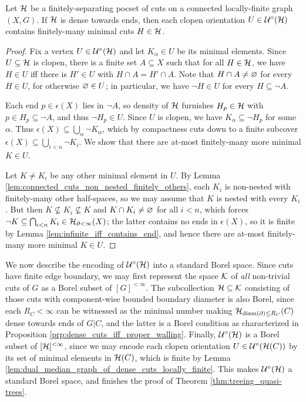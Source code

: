 \documentclass[reqno]{amsart}
\begin{document}
    \begin{lemma}\label{lem:dual_median_graph_of_dense_cuts_locally_finite}
        Let $\mc{H}$ be a finitely-separating pocset of cuts on a connected locally-finite graph $(X,G)$. If $\mc{H}$ is dense towards ends, then each clopen orientation $U\in\mc{U}^\circ(\mc{H})$ contains finitely-many minimal cuts $H\in\mc{H}$.
    \end{lemma}
    \begin{proof}
        Fix a vertex $U\in\mc{U}^\circ(\mc{H})$ and let $K_\alpha\in U$ be its minimal elements. Since $U\subseteq\mc{H}$ is clopen, there is a finite set $A\subseteq X$ such that for all $H\in\mc{H}$, we have $H\in U$ iff there is $H'\in U$ with $H\cap A=H'\cap A$. Note that $H\cap A\neq\em$ for every $H\in U$, for otherwise $\em\in U$; in particular, we have $\lnot H\in U$ for every $H\subseteq\lnot A$.

        Each end $p\in\epsilon(X)$ lies in $\lnot A$, so density of $\mc{H}$ furnishes $H_p\in\mc{H}$ with $p\in H_p\subseteq\lnot A$, and thus $\lnot H_p\in U$. Since $U$ is clopen, we have $K_\alpha\subseteq\lnot H_p$ for some $\alpha$. Thus $\epsilon(X)\subseteq\bigcup_\alpha\lnot K_\alpha$, which by compactness cuts down to a finite subcover $\epsilon(X)\subseteq\bigcup_{i<n}\lnot K_i$. We show that there are at-most finitely-many more minimal $K\in U$.

        Let $K\neq K_i$ be any other minimal element in $U$. By Lemma \ref{lem:connected_cuts_non_nested_finitely_others}, each $K_i$ is non-nested with finitely-many other half-spaces, so we may assume that $K$ is nested with every $K_i$. But then $K\not\subseteq K_i\not\subseteq K$ and $K\cap K_i\neq\em$ for all $i<n$, which forces $\lnot K\subseteq\bigcap_{i<n}K_i\in\mc{H}_{\del<\infty}(X)$; the latter contains no ends in $\epsilon(X)$, so it is finite by Lemma \ref{lem:infinite_iff_contains_end}, and hence there are at-most finitely-many more minimal $K\in U$.
    \end{proof}

    We now describe the encoding of $\mc{U}^\circ(\mc{H})$ into a standard Borel space. Since cuts have finite edge boundary, we may first represent the space $\mc{K}$ of \textit{all} non-trivial cuts of $G$ as a Borel subset of $[G]^{<\infty}$. The subcollection $\mc{H}\subseteq\mc{K}$ consisting of those cuts with component-wise bounded boundary diameter is also Borel, since each $R_C<\infty$ can be witnessed as the minimal number making $\mc{H}_{\diam(\del)\leq R_C}(C)$ dense towards ends of $G|C$, and the latter is a Borel condition as characterized in Proposition \ref{prp:dense_cuts_iff_proper_walling}. Finally, $\mc{U}^\circ(\mc{H})$ is a Borel subset of $[\mc{H}]^{<\infty}$, since we may encode each clopen orientation $U\in\mc{U}^\circ(\mc{H}(C))$ by its set of minimal elements in $\mc{H}(C)$, which is finite by Lemma \ref{lem:dual_median_graph_of_dense_cuts_locally_finite}. This makes $\mc{U}^\circ(\mc{H})$ a standard Borel space, and finishes the proof of Theorem \ref{thm:treeing_quasi-trees}.
\end{document}
